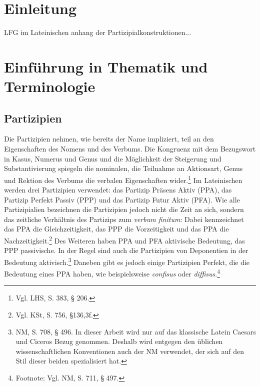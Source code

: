 \documentclass[12pt,a4paper]{article}
\begin{document}

\setcounter{page}{2}
\begingroup
\flushbottom
\tableofcontents
\thispagestyle{empty}
\pagebreak
\endgroup

\nocite{lucil1}
\nocite{lucil2} 
\nocite{original}
\nocite{seneca66} 
\nocite{hachmann1995} 
\nocite{bartsch}  
\nocite{philatinFLU} 
\nocite{becker1893sittlichen} 
\nocite{cancik} 
\nocite{inwood}
\nocite{edwards}
\nocite{motto} 
\nocite{becker1893sittlichen}
\nocite{philatinAUDIS}


\section{Einleitung}
LFG im Lateinischen anhang der Partizipialkonstruktionen...
\section{Einführung in Thematik und Terminologie}
\subsection{Partizipien}
Die Partizipien nehmen, wie bereits der Name impliziert, teil an den Eigenschaften des Nomens und des Verbums. Die Kongruenz mit dem Bezugswort in Kasus, Numerus und Genus und die Möglichkeit der Steigerung und Substantivierung spiegeln die nominalen, die Teilnahme an Aktionsart, Genus und Rektion des Verbums die verbalen Eigenschaften wider.\footnote{Vgl. LHS, S. 383, § 206.}
Im Lateinischen werden drei Partizipien verwendet: das Partizip Präsens Aktiv (PPA), das Partizip Perfekt Passiv (PPP) und das Partizip Futur Aktiv (PFA).
Wie alle Partizipialien bezeichnen die Partizipien jedoch nicht die Zeit an sich, sondern das zeitliche Verhältnis des Partizips zum \textit{verbum finitum}: Dabei kennzeichnet das PPA die Gleichzeitigkeit, das PPP die Vorzeitigkeit und das PPA die Nachzeitigkeit.\footnote{Vgl. KSt, S. 756, §136,3f.}
Des Weiteren haben PPA und PFA aktivische Bedeutung, das PPP passivische. In der Regel sind auch die Partizipien von Deponentien in der Bedeutung aktivisch.\footnote{NM, S. 708, § 496. In dieser Arbeit wird nur auf das klassische Latein Caesars und Ciceros Bezug genommen. Deshalb wird entgegen den üblichen wissenschaftlichen Konventionen auch der NM verwendet, der sich auf den Stil dieser beiden spezialisiert hat.} Daneben gibt es jedoch einige Partizipien Perfekt, die die Bedeutung eines PPA haben, wie beispielsweise \textit{confisus} oder \textit{diffisus}.\footnote{Footnote: Vgl. NM, S. 711, § 497.}
\end{document}
